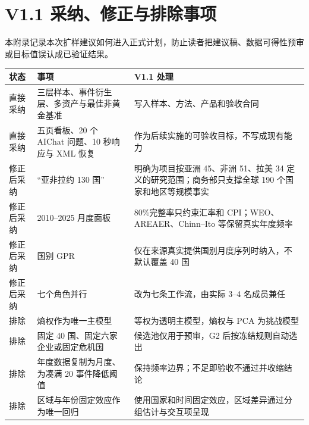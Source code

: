 \documentclass[UTF8,12pt,openany]{ctexbook}
\begin{document}
\chapter{V1.1 采纳、修正与排除事项}
本附录记录本次扩样建议如何进入正式计划，防止读者把建议稿、数据可得性预审或目标值误认成已验证结果。

\begin{longtable}{p{2.3cm}p{5.5cm}p{6.1cm}}
\toprule
\textbf{状态} & \textbf{事项} & \textbf{V1.1 处理}\\
\midrule
直接采纳 & 三层样本、事件衍生层、多资产与最佳非黄金基准 & 写入样本、方法、产品和验收合同\\
直接采纳 & 五页看板、20 个 AIChat 问题、10 秒响应与 XML 恢复 & 作为后续实施的可验收目标，不写成现有能力\\
修正后采纳 & “亚非拉约 130 国” & 明确为项目按亚洲 45、非洲 51、拉美 34 定义的研究范围；商务部只支撑全球 190 个国家和地区等规模事实\\
修正后采纳 & 2010--2025 月度面板 & 80\%完整率只约束汇率和 CPI；WEO、AREAER、Chinn--Ito 等保留真实年度频率\\
修正后采纳 & 国别 GPR & 仅在来源真实提供国别月度序列时纳入，不默认覆盖 40 国\\
修正后采纳 & 七个角色并行 & 改为七条工作流，由实际 3--4 名成员兼任\\
排除 & 熵权作为唯一主模型 & 等权为透明主模型，熵权与 PCA 为挑战模型\\
排除 & 固定 40 国、固定六家企业或固定危机国 & 候选池仅用于预审，G2 后按冻结规则自动选出\\
排除 & 年度数据复制为月度、为凑满 20 事件降低阈值 & 保持频率边界；不足即验收不通过并收缩结论\\
排除 & 区域与年份固定效应作为唯一回归 & 使用国家和时间固定效应，区域差异通过分组估计与交互项呈现\\
\bottomrule
\end{longtable}
\end{document}
